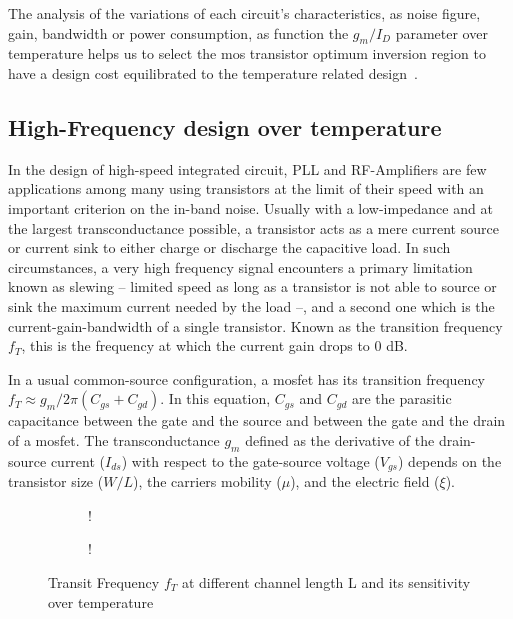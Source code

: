 The analysis of the variations of each circuit's characteristics, as noise figure, gain, bandwidth or power consumption, as function the \(g_m/I_{D} \) parameter over temperature helps us to select the mos transistor optimum inversion region to have a design cost equilibrated to the temperature related design~\cite{Shoucair1986, Silveira1996, Girardi2006, Zhang2017}.

\subsection{High-Frequency design over temperature}
\label{sec:des_speed}
In the design of high-speed integrated circuit, PLL and RF-Amplifiers are few applications among many using transistors at the limit of their speed with an important criterion on the in-band noise. Usually with a low-impedance and at the largest transconductance possible, a transistor acts as a mere current source or current sink to either charge or discharge the capacitive load. In such circumstances, a very high frequency signal encounters a primary limitation known as slewing -- limited speed as long as a transistor is not able to source or sink the maximum current needed by the load --, and a second one which is the current-gain-bandwidth of a single transistor. Known as the transition frequency \(f_T \), this is the frequency at which the current gain drops to 0 dB.

In a usual common-source configuration, a mosfet has its transition frequency \(f_T \approx g_m/2\pi (C_{gs}+C_{gd})\). In this equation, \(C_{gs} \) and  \(C_{gd} \) are the parasitic capacitance between the gate and the source and between the gate and the drain of a mosfet. The transconductance \(g_m \) defined as the derivative of the drain-source current (\(I_{ds} \)) with respect to the gate-source voltage (\(V_{gs}\)) depends on the transistor size (\(W/L\)), the carriers mobility (\(\mu \)), and the electric field (\(\xi \)).

\begin{figure}[!ht]
    \centering
    \begin{subfigure}[b]{0.48\textwidth}
        \resizebox {\textwidth} {!} { 
            
        }
    \end{subfigure}
    \begin{subfigure}[b]{0.48\textwidth}
        \resizebox {\textwidth} {!} { 
            
        }
        \label{fig:ft_nel_sensitivity}
    \end{subfigure}
    \caption{Transit Frequency \(f_T\) at different channel length L and its sensitivity over temperature}
    \label{fig:ft_nel}
\end{figure}

